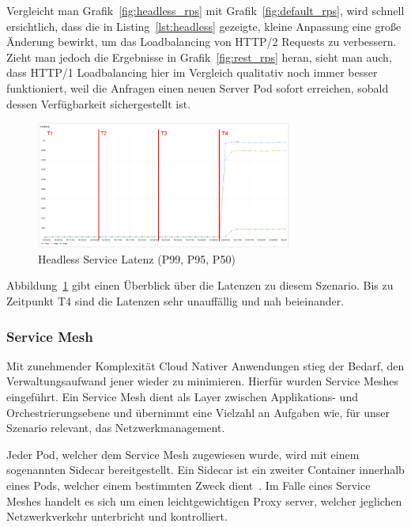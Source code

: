 Vergleicht man Grafik~\ref{fig:headless_rps} mit Grafik~\ref{fig:default_rps}, wird schnell ersichtlich, dass die in Listing~\ref{lst:headless} gezeigte, kleine Anpassung eine große Änderung bewirkt, um das Loadbalancing von HTTP/2 Requests zu verbessern.
Zieht man jedoch die Ergebnisse in Grafik~\ref{fig:rest_rps} heran, sieht man auch, dass HTTP/1 Loadbalancing hier im Vergleich qualitativ noch immer besser funktioniert, weil die Anfragen einen neuen Server Pod sofort erreichen, sobald dessen Verfügbarkeit sichergestellt ist.

\begin{figure}[H]
    \centering
    \includegraphics[width=0.75\textwidth]{img/headless_latenz}
    \caption{Headless Service Latenz (P99, P95, P50)}
    \label{fig:headless_latenz}
\end{figure}

Abbildung~\ref{fig:headless_latenz} gibt einen Überblick über die Latenzen zu diesem Szenario.
Bis zu Zeitpunkt T4 sind die Latenzen sehr unauffällig und nah beieinander.

\subsubsection{Service Mesh}\label{subsubsec:mesh}

Mit zunehmender Komplexität Cloud Nativer Anwendungen stieg der Bedarf, den Verwaltungsaufwand jener wieder zu minimieren.
Hierfür wurden Service Meshes eingeführt.
Ein Service Mesh dient als Layer zwischen Applikations- und Orchestrierungsebene und übernimmt eine Vielzahl an Aufgaben wie, für unser Szenario relevant, das Netzwerkmanagement.

Jeder Pod, welcher dem Service Mesh zugewiesen wurde, wird mit einem sogenannten Sidecar bereitgestellt.
Ein Sidecar ist ein zweiter Container innerhalb eines Pods, welcher einem bestimmten Zweck dient~\cite{koschel2021look}.
Im Falle eines Service Meshes handelt es sich um einen leichtgewichtigen Proxy server, welcher jeglichen Netzwerkverkehr unterbricht und kontrolliert.

